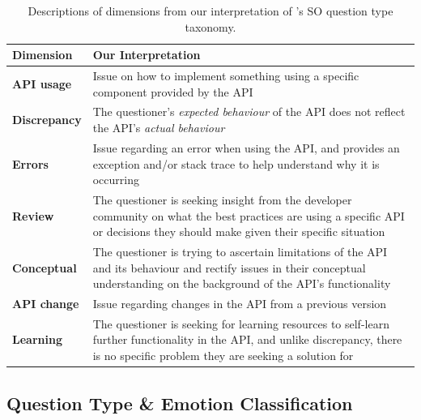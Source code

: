 \begin{table}[tb]
  \centering
  \caption[Our interpretations from a Stack Overflow question type taxonomy]{Descriptions of dimensions from our interpretation of \citeauthor{Beyer:2018fm}'s SO question type taxonomy.}
  \label{semotion2020:tab:taxonomies}
  \small
  \begin{tabular}{p{.2\linewidth}p{.75\linewidth}}
    \toprule

    \textbf{Dimension} & \textbf{Our Interpretation}
    \\
    \midrule
    
    \textbf{API usage\dotfill} &
    Issue on how to implement something using a specific component provided by the API
    \\

    \textbf{Discrepancy\dotfill} &
    The questioner's \textit{expected behaviour} of the API does not reflect the API's \textit{actual behaviour}
    \\

    \textbf{Errors\dotfill} &
    Issue regarding an error when using the API, and provides an exception and/or stack trace to help understand why it is occurring
    \\

    \textbf{Review\dotfill} &
    The questioner is seeking insight from the developer community on what the best practices are using a specific API or decisions they should make given their specific situation
    \\

    \textbf{Conceptual\dotfill} &
    The questioner is trying to ascertain limitations of the API and its behaviour and rectify issues in their conceptual understanding on the background of the API's functionality
    \\

    \textbf{API change\dotfill} &
    Issue regarding changes in the API from a previous version
    \\

    \textbf{Learning\dotfill} &
    The questioner is seeking for learning resources to self-learn further functionality in the API, and unlike discrepancy, there is no specific problem they are seeking a solution for
    \\
    \bottomrule 
  \end{tabular}
\end{table}

\subsection{Question Type \& Emotion Classification}

